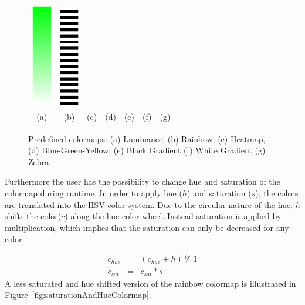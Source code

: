 \begin{figure}[htbp]
\begin{tabular}{ccccccc}
      \includegraphics[height=1.75in]{figures/colormaps/whiteGradient.png}&
      \includegraphics[height=1.75in]{figures/colormaps/zebra.png}\\
    (a)&(b)&(c)&(d)&(e)&(f)&(g)\\
    \end{tabular}
    \caption{Predefined colormaps: (a) Luminance, (b) Rainbow, (c) Heatmap, (d)  Blue-Green-Yellow, (e) Black Gradient (f) White Gradient (g) Zebra}
    \label{fig:colormaps}
\end{figure}


Furthermore the user has the possibility to change hue and saturation of the  colormap during runtime. In order to apply hue ($h$) and saturation ($s$), the colors are translated into the HSV color system. Due to the circular nature of the hue, $h$ shifts the color($c$) along the hue color wheel. Instead saturation is applied by multiplication, which implies that the saturation can only be decreased for any color.

\begin{eqnarray*}
c_{hue} &=&  (c_{hue} + h)~\%~1\\
c_{sat} &=& c_{sat} * s
\end{eqnarray*}
A less saturated and hue shifted version of the rainbow colormap is illustrated in Figure~\ref{fig:saturationAndHueColormap}.

